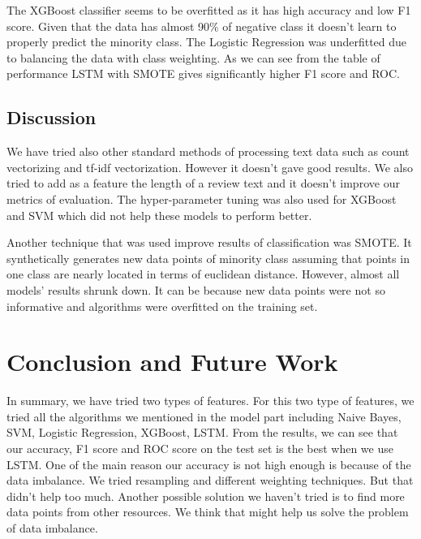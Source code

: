 \documentclass[10pt]{article}
\begin{document}
The XGBoost classifier seems to be overfitted as it has high accuracy and low F1 score. Given that the data has almost 90\% of negative class it doesn't learn to properly predict the minority class. The Logistic Regression was underfitted due to balancing the data with class weighting. As we can see from the table of performance LSTM with SMOTE gives significantly higher F1 score and ROC. 

\subsection{Discussion}
We have tried also other standard methods of processing text data such as count vectorizing and tf-idf vectorization. However it doesn't gave good results. We also tried to add as a feature the length of a review text and it doesn't improve our metrics of evaluation. The hyper-parameter tuning was also used for XGBoost and SVM which did not help these models to perform better. 

Another technique that was used improve results of classification was SMOTE. It synthetically generates new data points of minority class assuming that points in one class are nearly located in terms of euclidean distance. However, almost all models' results shrunk down. It can be because new data points were not so informative and algorithms were overfitted on the training set.     



\section{Conclusion and Future Work}

In summary, we have tried two types of features. For this two type of features, we tried all the algorithms we mentioned in the model part including Naive Bayes, SVM,
Logistic Regression, XGBoost, LSTM. From the results, we can see that our accuracy, F1 score and ROC score on the test set is the best when we use LSTM. One of the main reason our accuracy is not high enough is because of the data imbalance. We tried resampling and different weighting techniques. But that didn’t help too much. Another possible solution we haven’t tried is to find more data points from other resources. We think that might help us solve the problem of data imbalance.
 


\end{document}

